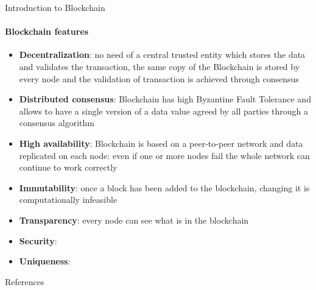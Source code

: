 \documentclass{beamer}
\begin{document}
  \begin{frame}[allowframebreaks]{Introduction to Blockchain}
    \framesubtitle{Blockchain features}

    \begin{itemize}
      \item \textbf{Decentralization}: no need of a central trusted entity
      which stores the data and validates the transaction, the same copy of the
      Blockchain is stored by every node and the validation of transaction is
      achieved through consensus \pause
      \item \textbf{Distributed consensus}: Blockchain has high Byzantine Fault
      Tolerance and allows to have a single version of a data value agreed by all
      parties through a consensus algorithm \pause
      \item \textbf{High availability}: Blockchain is based on a peer-to-peer
      network and data replicated on each node: even if one or more nodes fail
      the whole network can continue to work correctly \pause
      \item \textbf{Immutability}: once a block has been added to the blockchain,
      changing it is computationally infeasible \pause
      \item \textbf{Transparency}: every node can see what is in the blockchain \pause
      \item \textbf{Security}: \pause
      \item \textbf{Uniqueness}:
    \end{itemize}
  \end{frame}











  \begin{frame}{References}
    \printbibliography
  \end{frame}
\end{document}
